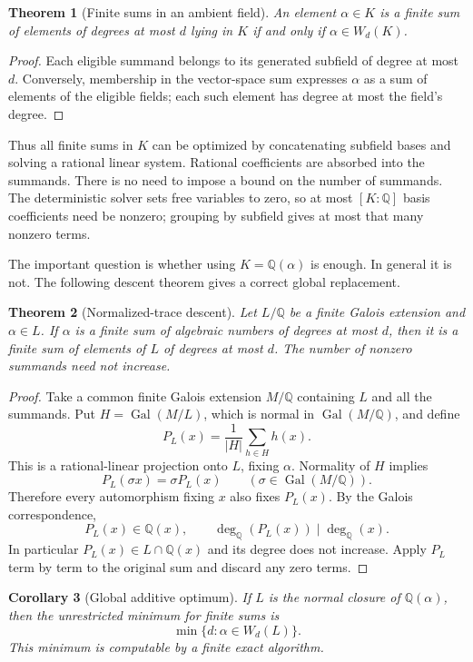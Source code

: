 \documentclass[11pt,a4paper]{article}
\newcommand{\Q}{\mathbb Q}
\newcommand{\degQ}{\operatorname{deg}_{\Q}}
\newcommand{\Gal}{\operatorname{Gal}}
\newtheorem{theorem}{Theorem}[section]
\newtheorem{corollary}[theorem]{Corollary}
\theoremstyle{remark}\newtheorem{remark}[theorem]{Remark}
\begin{document}
\begin{theorem}[Finite sums in an ambient field]
An element $\alpha\in K$ is a finite sum of elements of degrees at most $d$ lying in $K$ if and only if $\alpha\in W_d(K)$.
\end{theorem}
\begin{proof}
Each eligible summand belongs to its generated subfield of degree at most $d$. Conversely, membership in the vector-space sum expresses $\alpha$ as a sum of elements of the eligible fields; each such element has degree at most the field's degree.
\end{proof}
Thus all finite sums in $K$ can be optimized by concatenating subfield bases and solving a rational linear system. Rational coefficients are absorbed into the summands. There is no need to impose a bound on the number of summands. The deterministic solver sets free variables to zero, so at most $[K:\Q]$ basis coefficients need be nonzero; grouping by subfield gives at most that many nonzero terms.

The important question is whether using $K=\Q(\alpha)$ is enough. In general it is not. The following descent theorem gives a correct global replacement.

\begin{theorem}[Normalized-trace descent]
\label{thm:descent}
Let $L/\Q$ be a finite Galois extension and $\alpha\in L$. If $\alpha$ is a finite sum of algebraic numbers of degrees at most $d$, then it is a finite sum of elements of $L$ of degrees at most $d$. The number of nonzero summands need not increase.
\end{theorem}
\begin{proof}
Take a common finite Galois extension $M/\Q$ containing $L$ and all the summands. Put $H=\Gal(M/L)$, which is normal in $\Gal(M/\Q)$, and define
\[
 P_L(x)=\frac1{|H|}\sum_{h\in H}h(x).
\]
This is a rational-linear projection onto $L$, fixing $\alpha$. Normality of $H$ implies
\[
 P_L(\sigma x)=\sigma P_L(x)
 \qquad (\sigma\in\Gal(M/\Q)).
\]
Therefore every automorphism fixing $x$ also fixes $P_L(x)$. By the Galois correspondence,
\[
 P_L(x)\in\Q(x),\qquad
 \degQ(P_L(x))\mid\degQ(x).
\]
In particular $P_L(x)\in L\cap\Q(x)$ and its degree does not increase. Apply $P_L$ term by term to the original sum and discard any zero terms.
\end{proof}

\begin{corollary}[Global additive optimum]
If $L$ is the normal closure of $\Q(\alpha)$, then the unrestricted minimum for finite sums is
\[
 \boxed{\min\{d:\alpha\in W_d(L)\}.}
\]
This minimum is computable by a finite exact algorithm.
\end{corollary}
\end{document}
